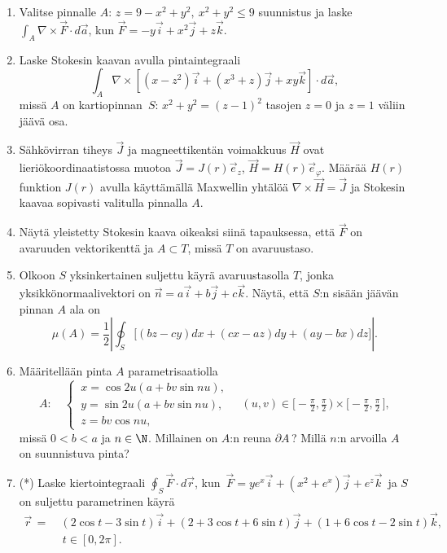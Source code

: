 \begin{enumerate}
\item
Valitse pinnalle $A:\,z=9-x^2+y^2,\ x^2+y^2 \le 9$ suunnistus ja laske 
$\int_A \nabla\times\vec F \cdot d\vec a$, kun $\vec F=-y\vec i+x^2\vec j+z\vec k$.

\item
Laske Stokesin kaavan avulla pintaintegraali
\[
\int_{A} \nabla\times[(x-z^2)\vec i+(x^3+z)\vec j+xy\vec k] \cdot d\vec a,
\]
missä $A$ on kartiopinnan $\,S:\,x^2+y^2=(z-1)^2$ tasojen $z=0$ ja $z=1$ väliin jäävä osa.

\item 
Sähkövirran tiheys $\vec J$ ja magneettikentän voimakkuus $\vec H$ ovat lieriökoordinaatistossa
muotoa $\vec J= J(r)\vec e_z$, $\vec H = H(r)\vec e_\varphi$. Määrää $H(r)$ funktion $J(r)$ 
avulla käyttämällä Maxwellin yhtälöä $\nabla\times\vec H = \vec J$ ja Stokesin kaavaa 
sopivasti valitulla pinnalla $A$.

\item
Näytä yleistetty Stokesin kaava oikeaksi siinä tapauksessa, että $\vec F$ on avaruuden
vektorikenttä ja $A \subset T$, missä $T$ on avaruustaso.

\item
Olkoon $S$ yksinkertainen suljettu käyrä avaruustasolla $T$, jonka yksikkönormaalivektori on
$\vec n=a\vec i+b\vec j+c\vec k$. Näytä, että $S$:n sisään jäävän pinnan $A$ ala on
\[
\mu(A)=\frac{1}{2}\left|\oint_S \bigl[(bz-cy)dx+(cx-az)dy+(ay-bx)dz\bigr]\right|.
\]

\item
Määritellään pinta $A$ parametrisaatiolla
\[
A:\quad \begin{cases}
        \,x=\cos 2u(a+bv\sin nu), \\ \,y=\sin 2u(a+bv\sin nu), \\ \,z=bv\cos nu,
        \end{cases} \quad
(u,v) \in \bigl[-\tfrac{\pi}{2},\tfrac{\pi}{2}\,\bigr)\times
          \bigl[-\tfrac{\pi}{2},\tfrac{\pi}{2}\,\bigr],
\]
missä $0<b<a$ ja $n\in\N$. Millainen on $A$:n reuna $\partial A\,$? Millä $n$:n arvoilla $A$ on
suunnistuva pinta?

\item (*)
Laske kiertointegraali $\oint_S \vec F \cdot d\vec r$, kun
$\,\vec F=ye^x\vec i+(x^2+e^x)\vec j+e^z\vec k\,$ ja $S$ on suljettu parametrinen käyrä
\begin{align*}
\vec r \,=\ &(2\cos t-3\sin t)\vec i+(2+3\cos t+6\sin t)\vec j+(1+6\cos t-2\sin t)\vec k, \\
            &\,t\in[0,2\pi].
\end{align*}

\end{enumerate}